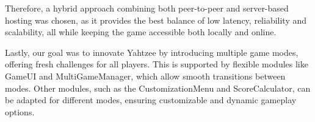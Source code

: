 \documentclass[12pt, titlepage]{article}
\begin{document}
\begin{enumerate}
  Therefore, a hybrid approach combining both peer-to-peer and server-based hosting was chosen, as it provides the best balance of low latency, reliability and scalability, all while keeping the game accessible both locally and online. 

  Lastly, our goal was to innovate Yahtzee by introducing multiple game modes, offering fresh challenges for all players. This is supported by flexible modules like GameUI and MultiGameManager, which allow smooth transitions between modes. Other modules, such as the CustomizationMenu and ScoreCalculator, can be adapted for different modes, ensuring customizable and dynamic gameplay options.
\end{enumerate}
\end{document}

